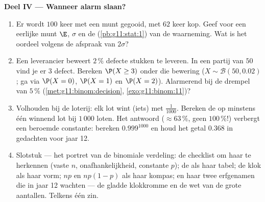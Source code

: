 \begin{problem}
\medskip
\noindent\textbf{Deel IV --- Wanneer alarm slaan?}
\begin{enumerate}[resume]
  \item Er wordt $100$ keer met een munt gegooid, met $62$ keer kop. Geef
        voor een eerlijke munt $\E$, $\sigma$ en de 
        (\cref{pb:g11:stat:1}) van de waarneming. Wat is het oordeel volgens
        de afspraak van $2\sigma$?
  \item Een leverancier beweert $2\,\%$ defecte stukken te leveren. In een
        partij van $50$ vind je er $3$ defect. Bereken $\P(X \geq 3)$ onder
        die bewering ($X \sim \mathcal B(50, 0.02)$; ga via $\P(X = 0)$,
        $\P(X = 1)$ en $\P(X = 2)$). Alarmerend bij de drempel van $5\,\%$
        (\cref{met:g11:binom:decision}, \cref{exo:g11:binom:11})?
  \item Volhouden bij de loterij: elk lot wint (iets) met 
        $\frac{1}{1000}$. Bereken de  op minstens één winnend lot bij
        $1\,000$ loten. Het antwoord ($\approx 63\,\%$, geen $100\,\%$!)
        verbergt een beroemde constante: bereken $0.999^{1000}$ en houd het
        getal $0.368$ in gedachten voor jaar 12.
  \item Slotstuk --- het portret van de binomiale verdeling: de checklist om
        haar te herkennen (vaste $n$, onafhankelijkheid, constante $p$); de
         als haar tabel; de klok als haar vorm; $np$ en
        $np(1-p)$ als haar kompas; en haar twee erfgenamen die in jaar 12
        wachten --- de gladde klokkromme en de wet van de grote aantallen.
        Telkens één zin.
\end{enumerate}
\end{problem}

